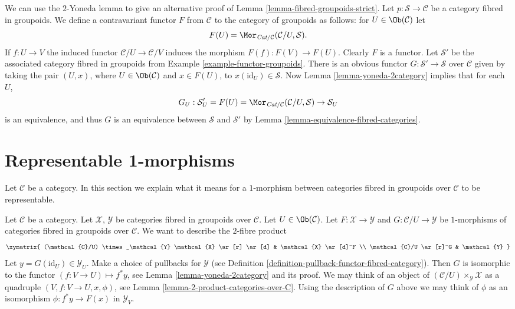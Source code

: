 \begin{remark}
\label{remark-alternative-fibred-groupoids-strict}
We can use the $2$-Yoneda lemma to give an alternative proof of
Lemma \ref{lemma-fibred-groupoids-strict}.
Let $p : \mathcal{S} \to \mathcal{C}$ be a category fibred in groupoids.
We define a contravariant functor $F$ from $\mathcal{C}$ to the
category of groupoids as follows: for $U\in \Ob(\mathcal{C})$
let
$$
F(U) = \Mor_{\textit{Cat}/\mathcal{C}}(\mathcal{C}/U, \mathcal{S}).
$$
If $f : U \to V$ the induced functor $\mathcal{C}/U \to \mathcal{C}/V$
induces the morphism $F(f) : F(V) \to F(U)$. Clearly $F$ is a functor.
Let $\mathcal{S}'$ be the associated category fibred in groupoids from
Example \ref{example-functor-groupoids}.
There is an obvious functor $G : \mathcal{S}' \to \mathcal{S}$
over $\mathcal{C}$ given by taking the pair $(U, x)$, where
$U \in \Ob(\mathcal{C})$ and $x \in F(U)$, to
$x(\text{id}_U) \in \mathcal{S}$. Now
Lemma \ref{lemma-yoneda-2category}
implies that for each $U$,
$$
G_U : \mathcal{S}'_U = F(U)=
\Mor_{\textit{Cat}/\mathcal{C}}(\mathcal{C}/U, \mathcal{S})
\to
\mathcal{S}_U
$$
is an equivalence, and thus $G$ is an equivalence between $\mathcal{S}$ and
$\mathcal{S}'$ by Lemma \ref{lemma-equivalence-fibred-categories}.
\end{remark}





\section{Representable 1-morphisms}
\label{section-representable-1-morphisms}

\noindent
Let $\mathcal{C}$ be a category.
In this section we explain what it means for a $1$-morphism
between categories fibred in groupoids over $\mathcal{C}$
to be representable.

\medskip\noindent
Let $\mathcal{C}$ be a category.
Let $\mathcal{X}$, $\mathcal{Y}$ be categories fibred in groupoids
over $\mathcal{C}$.
Let $U \in \Ob(\mathcal{C})$.
Let $F : \mathcal{X} \to \mathcal{Y}$ and
$G : \mathcal{C}/U \to \mathcal{Y}$ be $1$-morphisms of categories
fibred in groupoids over $\mathcal{C}$.
We want to describe
the $2$-fibre product
$$
\xymatrix{
(\mathcal{C}/U) \times_\mathcal{Y} \mathcal{X} \ar[r] \ar[d] &
\mathcal{X} \ar[d]^F \\
\mathcal{C}/U \ar[r]^G &
\mathcal{Y}
}
$$
Let $y = G(\text{id}_U) \in \mathcal{Y}_U$.
Make a choice of pullbacks for $\mathcal{Y}$
(see Definition \ref{definition-pullback-functor-fibred-category}).
Then $G$ is isomorphic to the functor $(f : V \to U) \mapsto f^*y$,
see Lemma \ref{lemma-yoneda-2category} and its proof.
We may think of an object of
$(\mathcal{C}/U) \times_\mathcal{Y} \mathcal{X}$
as a quadruple $(V, f : V \to U, x, \phi)$, see
Lemma \ref{lemma-2-product-categories-over-C}.
Using the description of $G$ above we may think of $\phi$ as
an isomorphism $\phi : f^*y \to F(x)$ in $\mathcal{Y}_V$.

